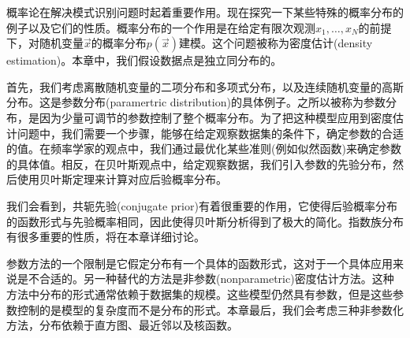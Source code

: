 概率论在解决模式识别问题时起着重要作用。现在探究一下某些特殊的概率分布的例子以及它们的性质。概率分布的一个作用是在给定有限次观测$x_1,\dots,x_N$的前提下，对随机变量$\vec{x}$的概率分布$p(\vec{x})$建模。这个问题被称为密度估计(density estimation)。本章中，我们假设数据点是独立同分布的。

首先，我们考虑离散随机变量的二项分布和多项式分布，以及连续随机变量的高斯分布。这是参数分布(paramertric distribution)的具体例子。之所以被称为参数分布，是因为少量可调节的参数控制了整个概率分布。为了把这种模型应用到密度估计问题中，我们需要一个步骤，能够在给定观察数据集的条件下，确定参数的合适的值。在频率学家的观点中，我们通过最优化某些准则(例如似然函数)来确定参数的具体值。相反，在贝叶斯观点中，给定观察数据，我们引入参数的先验分布，然后使用贝叶斯定理来计算对应后验概率分布。

我们会看到，共轭先验(conjugate prior)有着很重要的作用，它使得后验概率分布的函数形式与先验概率相同，因此使得贝叶斯分析得到了极大的简化。指数族分布有很多重要的性质，将在本章详细讨论。

参数方法的一个限制是它假定分布有一个具体的函数形式，这对于一个具体应用来说是不合适的。另一种替代的方法是非参数(nonparametric)密度估计方法。这种方法中分布的形式通常依赖于数据集的规模。这些模型仍然具有参数，但是这些参数控制的是模型的复杂度而不是分布的形式。本章最后，我们会考虑三种非参数化方法，分布依赖于直方图、最近邻以及核函数。

